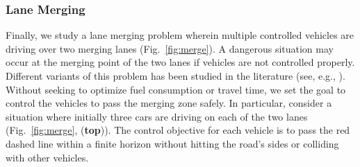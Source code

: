 %
%




\subsubsection{Lane Merging}
Finally, we study a lane merging problem wherein multiple controlled vehicles are driving over two merging lanes (Fig.~\ref{fig:merge}). A dangerous situation may occur at the merging point of the two lanes if vehicles are not controlled properly. Different variants of this problem has been studied in the literature (see, e.g., \cite{xiao2019merging,xiao2020merging}). Without seeking to optimize fuel consumption or travel time, we set the goal to control the vehicles to pass the merging zone safely. In particular, consider a situation where initially three cars are driving on each of the two lanes (Fig.~\ref{fig:merge}, (\textbf{top})). The control objective for each vehicle is to pass the red dashed line within a finite horizon without hitting the road's sides or colliding with other vehicles. 

